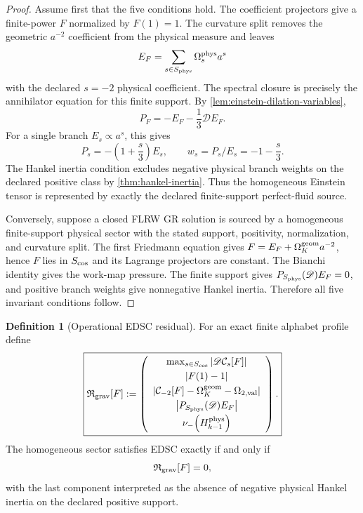 \documentclass[aps,prd,preprint,onecolumn,nofootinbib,superscriptaddress,showkeys]{revtex4-2}
\numberwithin{equation}{section}
\theoremstyle{definition}
\newtheorem{definition}{Definition}[section]
\theoremstyle{plain}
\newcommand{\Dil}{\mathscr D}
\begin{document}
\begin{proof}
Assume first that the five conditions hold.  The coefficient projectors give a finite-power \(F\) normalized by \(F(1)=1\).  The curvature split removes the geometric \(a^{-2}\) coefficient from the physical measure and leaves
\[
E_F=\sum_{s\in S_{\rm phys}}\Omega_s^{\rm phys}a^s
\]
with the declared \(s=-2\) physical coefficient.  The spectral closure is precisely the annihilator equation for this finite support.  By \cref{lem:einstein-dilation-variables},
\[
P_F=-E_F-\frac13\Dil E_F.
\]
For a single branch \(E_s\propto a^s\), this gives
\[
P_s=-\left(1+\frac{s}{3}\right)E_s,
\qquad
w_s=P_s/E_s=-1-\frac{s}{3}.
\]
The Hankel inertia condition excludes negative physical branch weights on the declared positive class by \cref{thm:hankel-inertia}.  Thus the homogeneous Einstein tensor is represented by exactly the declared finite-support perfect-fluid source.

Conversely, suppose a closed FLRW GR solution is sourced by a homogeneous finite-support physical sector with the stated support, positivity, normalization, and curvature split.  The first Friedmann equation gives \(F=E_F+\Omega_K^{\rm geom}a^{-2}\), hence \(F\) lies in \(S_{\rm cos}\) and its Lagrange projectors are constant.  The Bianchi identity gives the work-map pressure.  The finite support gives \(P_{S_{\rm phys}}(\Dil)E_F=0\), and positive branch weights give nonnegative Hankel inertia.  Therefore all five invariant conditions follow.
\end{proof}

\begin{definition}[Operational EDSC residual]\label{def:edsc-residual}
For an exact finite alphabet profile define
\begin{equation}
\boxed{
\mathfrak R_{\rm grav}[F]
:=
\left(
\begin{array}{c}
\max_{s\in S_{\rm cos}}\left|\Dil\mathcal C_s[F]\right|\\[1mm]
|F(1)-1|\\[1mm]
\left|\mathcal C_{-2}[F]-\Omega_K^{\rm geom}-\Omega_{2,{\rm val}}\right|\\[1mm]
\left|P_{S_{\rm phys}}(\Dil)E_F\right|\\[1mm]
\nu_-\!\left(H_{k-1}^{\rm phys}\right)
\end{array}
\right).
}
\end{equation}
The homogeneous sector satisfies EDSC exactly if and only if
\begin{equation}
\mathfrak R_{\rm grav}[F]=0,
\end{equation}
with the last component interpreted as the absence of negative physical Hankel inertia on the declared positive support.
\end{definition}
\end{document}
